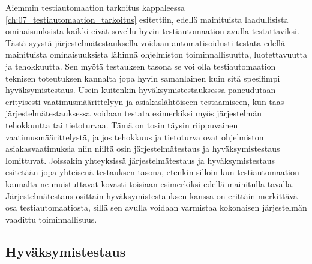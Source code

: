 

  Aiemmin testiautomaation tarkoitus kappaleessa \ref{ch:07_testiautomaation_tarkoitus} esitettiin, edellä mainituista laadullisista ominaisuuksista kaikki eivät sovellu hyvin testiautomaation avulla testattaviksi.
  Tästä syystä järjestelmätestauksella voidaan automatisoidusti testata edellä mainituista ominaisuuksista lähinnä ohjelmiston toiminnallisuutta, luotettavuutta ja tehokkuutta.
  Sen myötä testauksen tasona se voi olla testiautomaation teknisen toteutuksen kannalta jopa hyvin samanlainen kuin sitä spesifimpi hyväksymistestaus.
  Usein kuitenkin hyväksymistestauksessa paneudutaan erityisesti vaatimusmäärittelyyn ja asiakaslähtöiseen testaamiseen, kun taas järjestelmätestauksessa voidaan testata esimerkiksi myös järjestelmän tehokkuutta tai tietoturvaa.
  Tämä on tosin täysin riippuvainen vaatimusmäärittelystä, ja jos tehokkuus ja tietoturva ovat ohjelmiston asiakasvaatimuksia niin niiltä osin järjestelmätestaus ja hyväksymistestaus lomittuvat.
  Joissakin yhteyksissä järjestelmätestaus ja hyväksymistestaus esitetään jopa yhteisenä testauksen tasona, etenkin silloin kun testiautomaation kannalta ne muistuttavat kovasti toisiaan esimerkiksi edellä mainitulla tavalla.
  Järjestelmätestaus osittain hyväksymistestauksen kanssa on erittäin merkittävä osa testiautomaatiosta, sillä sen avulla voidaan varmistaa kokonaisen järjestelmän vaadittu toiminnallisuus.

  \subsection{Hyväksymistestaus} \label{ch:07_hyvaksymistestaus}

